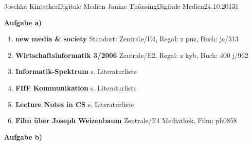 \documentclass{wa}
\begin{document}
		{Joschka Kintscher}{Digitale Medien}
		{Janine Thönsing}{Digitale Medien}{24.10.2013}{1}


\begin{LARGE}
  \textbf{Aufgabe a)}
\end{LARGE}

\begin{enumerate}
  \item\textbf{new media \& society}
  \newline
  Standort: Zentrale/E4, Regal: z puz, Buch: jc/313
  \newline
  \cite{vergeer2013}

  \item\textbf{Wirtschaftsinformatik 3/2006}
  \newline
   Zentrale/E2, Regal: z kyb, Buch: 400 j/962

  \item\textbf{Informatik-Spektrum}
  \newline
  s. Literaturliste

  \item\textbf{FIfF Kommunikation}
  \newline
  s. Literaturliste

  \item\textbf{Lecture Notes in CS}
  \newline
  s. Literaturliste
 
  \item\textbf{Film über Joseph Weizenbaum}
  \newline
  Zentrale/E4 Mediathek, Film: ph0858
  \newline
\end{enumerate}

\begin{LARGE}
  \textbf{Aufgabe b)}
\end{LARGE}



\end{document}

